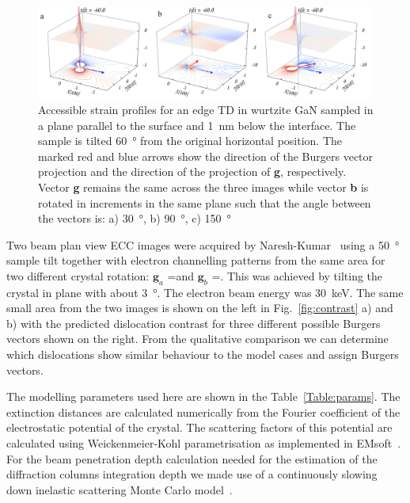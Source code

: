 \begin{figure}
    \centering
    \includegraphics[width=0.9\linewidth]{Figures/rotateEdge.png}
    \caption[Edge TD ECC-strain in different orientations.]{Accessible strain profiles for an edge TD in wurtzite GaN sampled in a plane parallel  to the surface and \SI{1}{\nano \meter} below the interface. The sample is tilted  \SI{60}{\degree} from the original horizontal position. The marked red and blue arrows show the direction of the Burgers vector projection and the direction of the projection of \textbf{g}, respectively. Vector\textbf{ g} remains the same across the three images while vector \textbf{b} is rotated in  increments in the same plane such that the angle between the vectors is: a) \SI{30}{\degree}, b) \SI{90}{\degree}, c) \SI{150}{\degree} }
    \label{fig:rotateEdge}
\end{figure}
\clearpage

\label{Naresh}
Two beam plan view ECC images were acquired by Naresh-Kumar~\cite{Naresh} using a \SI{50}{\degree}  sample tilt together with electron channelling patterns from the same area for two different crystal rotation: $\mathbf{g}_a$ =\hkl[-5-7-3] and $\mathbf{g}_b$ =\hkl[75-3]. This was achieved by tilting the crystal in plane with about \SI{3}{\degree}. The electron beam energy was \SI{30}{\kilo \electronvolt}. The same small area from the two images is shown on the left in Fig.~\ref{fig:contrast} a) and b) with the predicted dislocation contrast for three different possible Burgers vectors shown on the right. From the qualitative comparison we can determine which dislocations show similar behaviour to the model cases and assign Burgers vectors.

The modelling parameters used here are shown in the Table~\ref{Table:params}. The extinction distances are calculated numerically from the Fourier coefficient of the electrostatic potential of the crystal. The scattering factors of this potential are calculated using Weickenmeier-Kohl parametrisation as implemented in EMsoft~\cite{EMsoft}. For the beam penetration depth calculation needed for the estimation of the diffraction columns integration depth we made use of a continuously slowing down inelastic scattering Monte Carlo model~\cite{casino}. 


